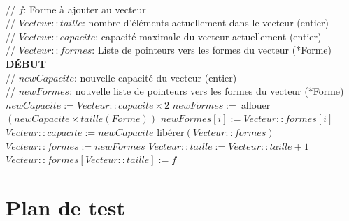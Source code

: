 \documentclass[a11paper, 11pt]{article}
\begin{document}
\begin{algorithm} %
\caption{Ajout d'un élément au vecteur}\label{alg:ajouterForme}
\begin{algorithmic}[1]
  \\
  \hspace{.5cm}// $f$: Forme à ajouter au vecteur\\
  \hspace{.5cm}// $Vecteur::taille$: nombre d'éléments actuellement dans le vecteur (entier)\\
  \hspace{.5cm}// $Vecteur::capacite$: capacité maximale du vecteur actuellement (entier)\\
  \hspace{.5cm}// $Vecteur::formes$: Liste de pointeurs vers les formes du vecteur (*Forme)\\
  \textbf{DÉBUT}\\
  \hspace{.5cm}// $newCapacite$: nouvelle capacité du vecteur (entier)\\
  \hspace{.5cm}// $newFormes$: nouvelle liste de pointeurs vers les formes du vecteur (*Forme)
    \State{}
  \EndIf
    \State $newCapacite := Vecteur::capacite\times2$
      \State{}
    \EndIf
    \State $newFormes :=\ $allouer$(newCapacite\times taille(Forme))$
      \State $newFormes[i] := Vecteur::formes[i]$
    \EndFor
    \State $Vecteur::capacite := newCapacite$
    \State libérer$(Vecteur::formes)$
    \State $Vecteur::formes := newFormes$
  \EndIf
  \State $Vecteur::taille := Vecteur::taille + 1$
  \State $Vecteur::formes[Vecteur::taille] := f$
  \State {}
  \EndFunction
\end{algorithmic}
\end{algorithm} %

\section{Plan de test}
\end{document}
